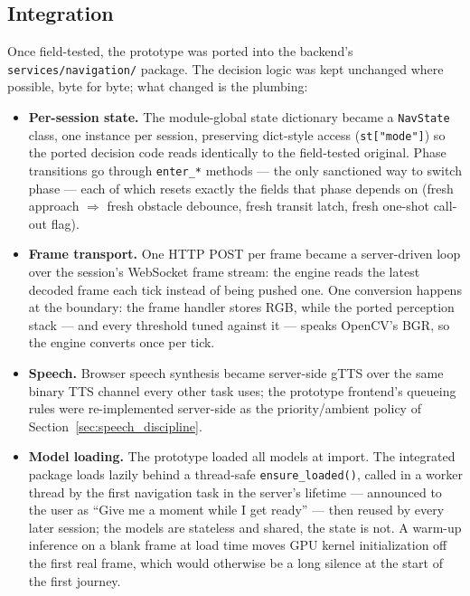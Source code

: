 \subsection{Integration}

Once field-tested, the prototype was ported into the backend's
\texttt{services/navigation/} package. The decision logic was kept unchanged
where possible, byte for byte; what changed is the plumbing:

\begin{itemize}[nosep]
  \item \textbf{Per-session state.} The module-global state dictionary became a
        \texttt{NavState} class, one instance per session, preserving dict-style
        access (\texttt{st["mode"]}) so the ported decision code reads identically
        to the field-tested original. Phase transitions go through
        \texttt{enter\_*} methods --- the only sanctioned way to switch phase ---
        each of which resets exactly the fields that phase depends on (fresh
        approach $\Rightarrow$ fresh obstacle debounce, fresh transit latch, fresh
        one-shot call-out flag).
  \item \textbf{Frame transport.} One HTTP POST per frame became a server-driven
        loop over the session's WebSocket frame stream: the engine reads the
        latest decoded frame each tick instead of being pushed one. One conversion
        happens at the boundary: the frame handler stores RGB, while the ported
        perception stack --- and every threshold tuned against it --- speaks
        OpenCV's BGR, so the engine converts once per tick.
  \item \textbf{Speech.} Browser speech synthesis became server-side gTTS over
        the same binary TTS channel every other task uses; the prototype
        frontend's queueing rules were re-implemented server-side as the
        priority/ambient policy of Section~\ref{sec:speech_discipline}.
  \item \textbf{Model loading.} The prototype loaded all models at import. The
        integrated package loads lazily behind a thread-safe
        \texttt{ensure\_loaded()}, called in a worker thread by the first
        navigation task in the server's lifetime --- announced to the user as
        ``Give me a moment while I get ready'' --- then reused by every later
        session; the models are stateless and shared, the state is not. A warm-up
        inference on a blank frame at load time moves GPU kernel initialization
        off the first real frame, which would otherwise be a long silence at the
        start of the first journey.
\end{itemize}

